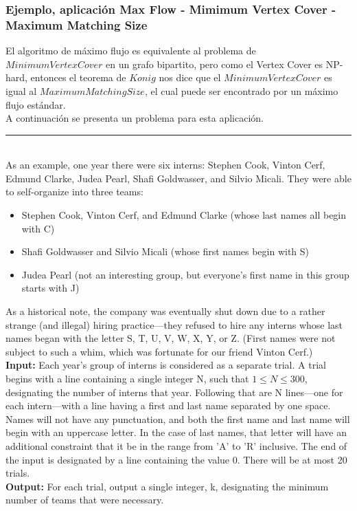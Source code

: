 \documentclass[10pt,letterpaper]{article}
\begin{document}
    \subsubsection{Ejemplo, aplicación Max Flow - Mimimum Vertex Cover - Maximum Matching Size}
    El algoritmo de máximo flujo es equivalente al problema de $Minimum Vertex Cover$ en un grafo bipartito, pero como el Vertex Cover es NP-hard, entonces el teorema de $Konig$ nos dice que el $Minimum Vertex Cover$ es igual al $Maximum Matching Size$, el cual puede ser encontrado por un máximo flujo estándar.\\
    A continuación se presenta un problema para esta aplicación.\\
\rule{12cm}{.1pt}\\
    As an example, one year there were six interns: Stephen Cook, Vinton Cerf, Edmund Clarke, Judea Pearl, Shafi Goldwasser, and Silvio Micali. They were able to self-organize into three teams:
    \begin{itemize}
      \item Stephen Cook, Vinton Cerf, and Edmund Clarke (whose last names all begin with C)
      \item Shafi Goldwasser and Silvio Micali (whose first names begin with S)
      \item Judea Pearl (not an interesting group, but everyone's first name in this group starts with J)
    \end{itemize}
As a historical note, the company was eventually shut down due to a rather strange (and illegal) hiring practice---they refused to hire any interns whose last names began with the letter S, T, U, V, W, X, Y, or Z. (First names were not subject to such a whim, which was fortunate for our friend Vinton Cerf.)\\
\textbf{Input:}  Each year's group of interns is considered as a separate trial. A trial begins with a line containing a single integer N, such that $1 \leq N \leq 300$, designating the number of interns that year. Following that are N lines---one for each intern---with a line having a first and last name separated by one space. Names will not have any punctuation, and both the first name and last name will begin with an uppercase letter. In the case of last names, that letter will have an additional constraint that it be in the range from 'A' to 'R' inclusive. The end of the input is designated by a line containing the value 0. There will be at most 20 trials.\\
\textbf{Output:}  For each trial, output a single integer, k, designating the minimum number of teams that were necessary.\\
\end{document}
